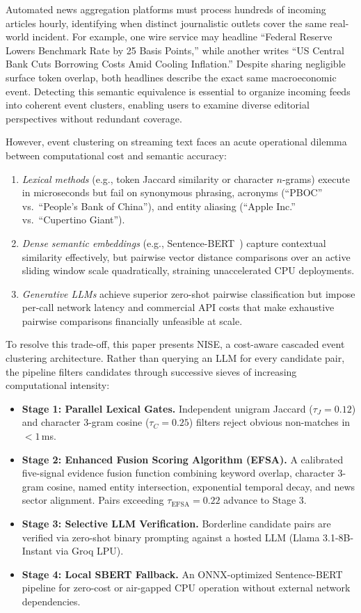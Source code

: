 \documentclass[conference]{IEEEtran}
\begin{document}
Automated news aggregation platforms must process hundreds of incoming articles hourly, identifying when distinct journalistic outlets cover the same real-world incident.
For example, one wire service may headline ``Federal Reserve Lowers Benchmark Rate by 25 Basis Points,'' while another writes ``US Central Bank Cuts Borrowing Costs Amid Cooling Inflation.''
Despite sharing negligible surface token overlap, both headlines describe the exact same macroeconomic event.
Detecting this semantic equivalence is essential to organize incoming feeds into coherent event clusters, enabling users to examine diverse editorial perspectives without redundant coverage.

However, event clustering on streaming text faces an acute operational dilemma between computational cost and semantic accuracy:
\begin{enumerate}
    \item \textit{Lexical methods} (e.g., token Jaccard similarity or character $n$-grams) execute in microseconds but fail on synonymous phrasing, acronyms (``PBOC'' vs.\ ``People's Bank of China''), and entity aliasing (``Apple Inc.'' vs.\ ``Cupertino Giant'').
    \item \textit{Dense semantic embeddings} (e.g., Sentence-BERT~\cite{reimers2019sentence}) capture contextual similarity effectively, but pairwise vector distance comparisons over an active sliding window scale quadratically, straining unaccelerated CPU deployments.
    \item \textit{Generative LLMs} achieve superior zero-shot pairwise classification but impose per-call network latency and commercial API costs that make exhaustive pairwise comparisons financially unfeasible at scale.
\end{enumerate}

To resolve this trade-off, this paper presents NISE, a cost-aware cascaded event clustering architecture.
Rather than querying an LLM for every candidate pair, the pipeline filters candidates through successive sieves of increasing computational intensity:
\begin{itemize}
    \item \textbf{Stage 1: Parallel Lexical Gates.} Independent unigram Jaccard ($\tau_J = 0.12$) and character 3-gram cosine ($\tau_C = 0.25$) filters reject obvious non-matches in $<1$\,ms.
    \item \textbf{Stage 2: Enhanced Fusion Scoring Algorithm (EFSA).} A calibrated five-signal evidence fusion function combining keyword overlap, character 3-gram cosine, named entity intersection, exponential temporal decay, and news sector alignment. Pairs exceeding $\tau_{\text{EFSA}} = 0.22$ advance to Stage 3.
    \item \textbf{Stage 3: Selective LLM Verification.} Borderline candidate pairs are verified via zero-shot binary prompting against a hosted LLM (Llama 3.1-8B-Instant via Groq LPU).
    \item \textbf{Stage 4: Local SBERT Fallback.} An ONNX-optimized Sentence-BERT pipeline for zero-cost or air-gapped CPU operation without external network dependencies.
\end{itemize}
\end{document}
